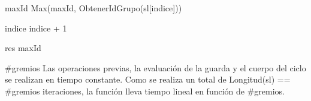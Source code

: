 % 
% 
% 
% 
% 
% 
% 


{
	\state {} 									

	\state
	\state {} 								
							
		\state
		
		\state maxId \asig Max(maxId, ObtenerIdGrupo(sl[indice]))			

		\state
		\state indice \asig indice + 1								
	\endwhile
	\state

	\state res \asig maxId											
}
{ \#gremios }
{ Las operaciones previas, la evaluaci\'on de la guarda y el cuerpo del ciclo se realizan en tiempo constante. Como se realiza un total de Longitud(sl) == \#gremios iteraciones, la funci\'on lleva tiempo lineal en funci\'on de \#gremios. }

